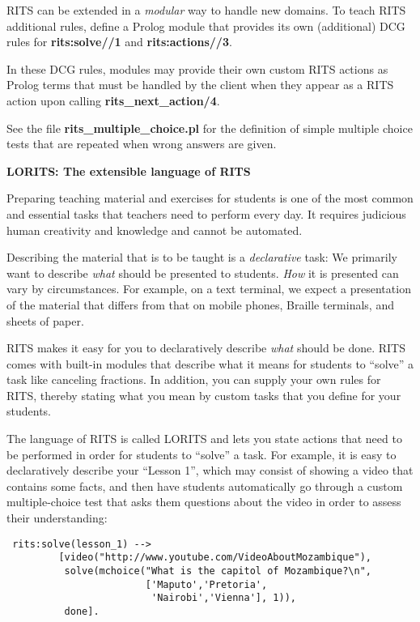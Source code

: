 \documentclass[a4paper,11pt]{article}
\begin{document}
RITS can be extended in a \textit{modular} way to handle new domains.
To teach RITS additional rules, define a Prolog module that provides
its own (additional) DCG rules for \textbf{rits:solve//1} and
\textbf{rits:actions//3}. 

In these DCG rules, modules may provide their own custom RITS actions
as Prolog terms that must be handled by the client when they appear as
a RITS action upon calling \textbf{rits\_next\_action/4}.

See the file \textbf{rits\_multiple\_choice.pl} for the definition of
simple multiple choice tests that are repeated when wrong answers are
given.

\bigskip
\begin{center}
  \large\textbf{LORITS: The extensible language of RITS}
\end{center}

\medskip
\noindent
Preparing teaching material and exercises for students is one of the
most common and essential tasks that teachers need to perform
every day. It requires judicious human creativity and knowledge and
cannot be automated.

Describing the material that is to be taught is a \textit{declarative}
task: We primarily want to describe \textit{what} should be presented
to students. \textit{How} it is presented can vary by circumstances.
For example, on a text terminal, we expect a presentation of the
material that differs from that on mobile phones, Braille terminals,
and sheets of paper.

RITS makes it easy for you to declaratively describe \textit{what}
should be done. RITS comes with built-in modules that describe what it
means for students to ``solve'' a task like canceling fractions. In
addition, you can supply your own rules for RITS, thereby stating what
you mean by custom tasks that you define for your students.

The language of RITS is called LORITS and lets you state actions that
need to be performed in order for students to ``solve'' a task. For
example, it is easy to declaratively describe your ``Lesson 1'', which
may consist of showing a video that contains some facts, and then have
students automatically go through a custom multiple-choice test that
asks them questions about the video in order to assess their
understanding:

\begin{verbatim}
 rits:solve(lesson_1) -->
         [video("http://www.youtube.com/VideoAboutMozambique"),
          solve(mchoice("What is the capitol of Mozambique?\n",
                        ['Maputo','Pretoria',
                         'Nairobi','Vienna'], 1)),
          done].
\end{verbatim}
\end{document}
